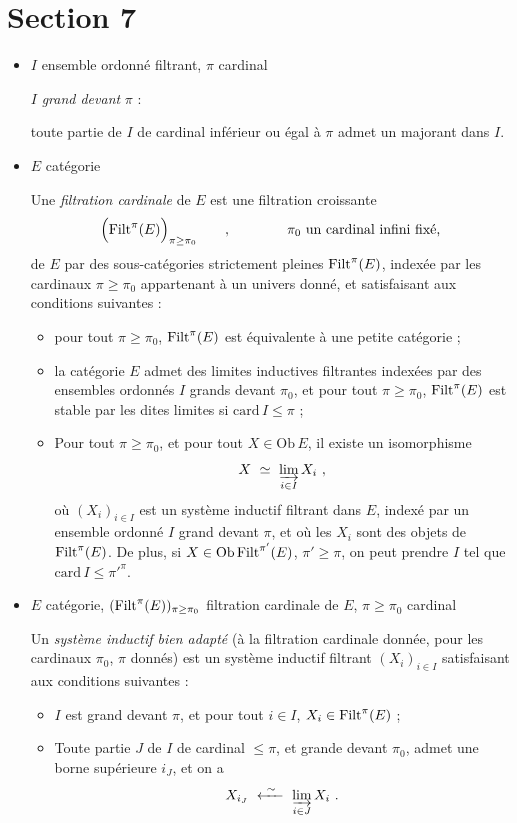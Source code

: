 \section*{Section 7}

\begin{itemize}
\item[\textbullet] $I$ ensemble ordonné filtrant, \quad $\pi$ cardinal

$I$ \textit{grand devant} $\pi$ :

toute partie de $I$ de cardinal inférieur ou égal à $\pi$ admet un majorant dans $I$.

\item[\textbullet] $E$ catégorie

Une \textit{filtration cardinale} de $E$ est une filtration croissante
\[
\Big(\mathrm{Filt}^{\pi}(E)\Big)_{\pi\geq\pi_0} \qquad , \qquad\qquad \pi_0 \text{ un cardinal infini fixé,}
\]
de $E$ par des sous-catégories strictement pleines $\mathrm{Filt}^{\pi}(E)$, indexée par les cardinaux $\pi \geq \pi_0$ appartenant à un univers donné, et satisfaisant aux conditions suivantes :
\begin{itemize}
\item[\textit{a})] pour tout $\pi \geq \pi_0$, $\mathrm{Filt}^{\pi}(E)$ est équivalente à une petite catégorie ;
\item[\textit{b})] la catégorie $E$ admet des limites inductives filtrantes indexées par des ensembles ordonnés $I$ grands devant $\pi_0$, et pour tout $\pi \geq \pi_0$, $\mathrm{Filt}^{\pi}(E)$ est stable par les dites limites si $\mathrm{card}\, I \leq \pi$ ;
\item[\textit{c})] Pour tout $\pi \geq \pi_0$, et pour tout $X \in \mathrm{Ob}\, E$, il existe un isomorphisme
\[
X \ \simeq\ \varinjlim_{i\in I} X_i \ ,
\]
où $(X_i)_{i\in I}$ est un système inductif filtrant dans $E$, indexé par un ensemble ordonné $I$ grand devant $\pi$, et où les $X_i$ sont des objets de $\mathrm{Filt}^{\pi}(E)$. De plus, si $X \in \mathrm{Ob}\,\mathrm{Filt}^{\pi'}(E)$, $\pi' \geq \pi$, on peut prendre $I$ tel que $\mathrm{card}\, I \leq \pi'^{\pi}$.
\end{itemize}

\item[\textbullet] $E$ catégorie, \quad $(\mathrm{Filt}^{\pi}(E))_{\pi\geq\pi_0}$ filtration cardinale de $E$, \quad $\pi \geq \pi_0$ cardinal

Un \textit{système inductif bien adapté} (à la filtration cardinale donnée, pour les cardinaux $\pi_0$, $\pi$ donnés) est un système inductif filtrant $(X_i)_{i\in I}$ satisfaisant aux conditions suivantes :
\begin{itemize}
\item[\textit{a})] $I$ est grand devant $\pi$, et pour tout $i \in I$, $X_i \in \mathrm{Filt}^{\pi}(E)$ ;
\item[\textit{b})] Toute partie $J$ de $I$ de cardinal $\leq \pi$, et grande devant $\pi_0$, admet une borne supérieure $i_J$, et on a
\[
X_{i_J} \ \xleftarrow{\ \sim\ }\ \varinjlim_{i\in J} X_i \ .
\]
\end{itemize}


\end{itemize}
